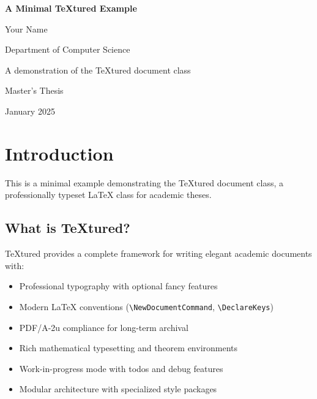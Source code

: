 \documentclass[12pt,a4paper]{textured}
\begin{document}
\frontmatter

% 
% 
% 

\begin{titlepage}
\centering
\vspace*{2cm}
{\Huge\bfseries A Minimal TeXtured Example\par}
\vspace{1.5cm}
{\Large Your Name\par}
\vspace{0.5cm}
{\large Department of Computer Science\par}
\vspace{3cm}
{\large A demonstration of the TeXtured document class\par}
\vfill
{\large Master's Thesis\par}
\vspace{0.5cm}
{\large January 2025\par}
\end{titlepage}

\cleardoublepage

\cleardoublepage

\tableofcontents

\cleardoublepage

\mainmatter

\chapter{Introduction}

This is a minimal example demonstrating the TeXtured document class, a professionally typeset \LaTeX{} class for academic theses.

\section{What is TeXtured?}

TeXtured provides a complete framework for writing elegant academic documents with:
\begin{itemize}
  \item Professional typography with optional fancy features
  \item Modern \LaTeX{} conventions (\verb|\NewDocumentCommand|, \verb|\DeclareKeys|)
  \item PDF/A-2u compliance for long-term archival
  \item Rich mathematical typesetting and theorem environments
  \item Work-in-progress mode with todos and debug features
  \item Modular architecture with specialized style packages
\end{itemize}
\end{document}

